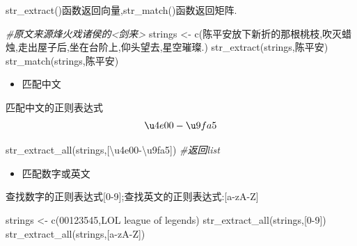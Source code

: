 \documentclass[
]{book}
\newenvironment{Shaded}{\begin{snugshade}}{\end{snugshade}}
\newcommand{\CommentTok}[1]{\textcolor[rgb]{0.56,0.35,0.01}{\textit{#1}}}
\newcommand{\FunctionTok}[1]{\textcolor[rgb]{0.00,0.00,0.00}{#1}}
\newcommand{\NormalTok}[1]{#1}
\newcommand{\OtherTok}[1]{\textcolor[rgb]{0.56,0.35,0.01}{#1}}
\newcommand{\StringTok}[1]{\textcolor[rgb]{0.31,0.60,0.02}{#1}}
\providecommand{\tightlist}{%
  \setlength{\itemsep}{0pt}\setlength{\parskip}{0pt}}
\begin{document}
str\_extract()函数返回向量,str\_match()函数返回矩阵.

\begin{Shaded}
\begin{Highlighting}[]
\CommentTok{\#原文来源烽火戏诸侯的\textless{}剑来\textgreater{}}
\NormalTok{strings }\OtherTok{\textless{}{-}} \FunctionTok{c}\NormalTok{(}\StringTok{\textquotesingle{}陈平安放下新折的那根桃枝,吹灭蜡烛,走出屋子后,坐在台阶上,仰头望去,星空璀璨.\textquotesingle{}}\NormalTok{) }
\FunctionTok{str\_extract}\NormalTok{(strings,}\StringTok{\textquotesingle{}陈平安\textquotesingle{}}\NormalTok{)}
\FunctionTok{str\_match}\NormalTok{(strings,}\StringTok{\textquotesingle{}陈平安\textquotesingle{}}\NormalTok{)}
\end{Highlighting}
\end{Shaded}

\begin{itemize}
\tightlist
\item
  匹配中文
\end{itemize}

匹配中文的正则表达式\[\u4e00-\u9fa5\]

\begin{Shaded}
\begin{Highlighting}[]
\FunctionTok{str\_extract\_all}\NormalTok{(strings,}\StringTok{\textquotesingle{}[\textbackslash{}u4e00{-}\textbackslash{}u9fa5]\textquotesingle{}}\NormalTok{) }\CommentTok{\#返回list}
\end{Highlighting}
\end{Shaded}

\begin{itemize}
\tightlist
\item
  匹配数字或英文
\end{itemize}

查找数字的正则表达式{[}0-9{]};查找英文的正则表达式:{[}a-zA-Z{]}

\begin{Shaded}
\begin{Highlighting}[]
\NormalTok{strings }\OtherTok{\textless{}{-}} \FunctionTok{c}\NormalTok{(}\StringTok{\textquotesingle{}00123545\textquotesingle{}}\NormalTok{,}\StringTok{\textquotesingle{}LOL league of legends\textquotesingle{}}\NormalTok{)}
\FunctionTok{str\_extract\_all}\NormalTok{(strings,}\StringTok{\textquotesingle{}[0{-}9]\textquotesingle{}}\NormalTok{)}
\FunctionTok{str\_extract\_all}\NormalTok{(strings,}\StringTok{\textquotesingle{}[a{-}zA{-}Z]\textquotesingle{}}\NormalTok{) }
\end{Highlighting}
\end{Shaded}
\end{document}
